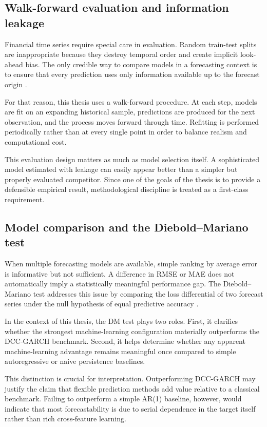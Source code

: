 \subsection{Walk-forward evaluation and information leakage}

Financial time series require special care in evaluation. Random train-test splits are inappropriate because they destroy temporal order and create implicit look-ahead bias. The only credible way to compare models in a forecasting context is to ensure that every prediction uses only information available up to the forecast origin \cite{tashman2000}.

For that reason, this thesis uses a walk-forward procedure. At each step, models are fit on an expanding historical sample, predictions are produced for the next observation, and the process moves forward through time. Refitting is performed periodically rather than at every single point in order to balance realism and computational cost.

This evaluation design matters as much as model selection itself. A sophisticated model estimated with leakage can easily appear better than a simpler but properly evaluated competitor. Since one of the goals of the thesis is to provide a defensible empirical result, methodological discipline is treated as a first-class requirement.

\subsection{Model comparison and the Diebold--Mariano test}

When multiple forecasting models are available, simple ranking by average error is informative but not sufficient. A difference in RMSE or MAE does not automatically imply a statistically meaningful performance gap. The Diebold--Mariano test addresses this issue by comparing the loss differential of two forecast series under the null hypothesis of equal predictive accuracy \cite{diebold1995, harvey1997}.

In the context of this thesis, the DM test plays two roles. First, it clarifies whether the strongest machine-learning configuration materially outperforms the DCC-GARCH benchmark. Second, it helps determine whether any apparent machine-learning advantage remains meaningful once compared to simple autoregressive or naive persistence baselines.

This distinction is crucial for interpretation. Outperforming DCC-GARCH may justify the claim that flexible prediction methods add value relative to a classical benchmark. Failing to outperform a simple AR(1) baseline, however, would indicate that most forecastability is due to serial dependence in the target itself rather than rich cross-feature learning.

